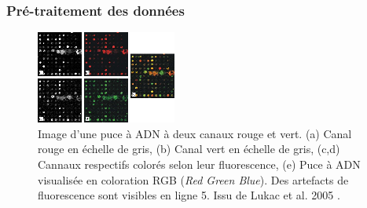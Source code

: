 


\subsubsection{Pré-traitement des données}



\begin{figure}[!h]
    \centering
    \includegraphics{img/intro/true_microarray_picture_10.1016_j.fss.2004.10.012.png}
    \caption[Image d'une puce à ADN à deux canaux rouge et vert]{Image d'une puce à ADN à deux canaux rouge et vert. (a) Canal rouge en échelle de gris, (b) Canal vert en échelle de gris, (c,d) Cannaux respectifs colorés selon leur fluorescence, (e) Puce à ADN visualisée en coloration RGB (\textit{Red Green Blue}). Des artefacts de fluorescence sont visibles en ligne 5. Issu de Lukac et al. 2005 \cite{Lukac2005May}.}
    \label{fig:true_microarray_picture_10.1016_j.fss.2004.10.012}
\end{figure}

